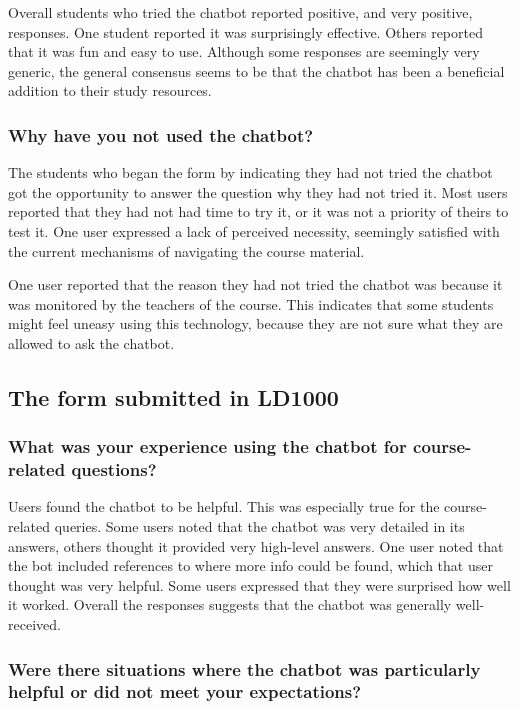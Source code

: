 Overall students who tried the chatbot reported positive, and very positive, responses. One student reported it was surprisingly effective. Others reported that it was fun and easy to use. Although some responses are seemingly very generic, the general consensus seems to be that the chatbot has been a beneficial addition to their study resources.


\subsubsection{Why have you not used the chatbot?}


The students who began the form by indicating they had not tried the chatbot got the opportunity to answer the question why they had not tried it. Most users reported that they had not had time to try it, or it was not a priority of theirs to test it. One user expressed a lack of perceived necessity, seemingly satisfied with the current mechanisms of navigating the course material.


One user reported that the reason they had not tried the chatbot was because it was monitored by the teachers of the course. This indicates that some students might feel uneasy using this technology, because they are not sure what they are allowed to ask the chatbot.


\subsection{The form submitted in LD1000}


\subsubsection{What was your experience using the chatbot for course-related questions?}


Users found the chatbot to be helpful. This was especially true for the course-related queries. Some users noted that the chatbot was very detailed in its answers, others thought it provided very high-level answers. One user noted that the bot included references to where more info could be found, which that user thought was very helpful. Some users expressed that they were surprised how well it worked. Overall the responses suggests that the chatbot was generally well-received.


\subsubsection{Were there situations where the chatbot was particularly helpful or did not meet your expectations?}


